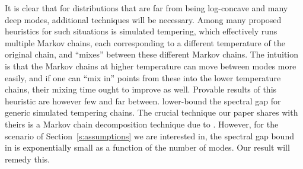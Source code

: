 
It is clear that for distributions that are far from being log-concave and many deep modes, additional techniques will be necessary. Among many proposed heuristics for such situations is simulated tempering, which effectively runs multiple Markov chains, each corresponding to a different temperature of the original chain, and ``mixes'' between these different Markov chains. The intuition is that the Markov chains at higher temperature can move between modes more easily, and if one can ``mix in'' points from these into the lower temperature chains, their mixing time ought to improve as well. Provable results of this heuristic are however few and far between.  
\cite{woodard2009conditions, zheng2003swapping} lower-bound the spectral gap for generic simulated tempering chains. The crucial technique our paper shares with theirs is a Markov chain decomposition technique due to \cite{madras2002markov}. However, for the scenario of Section~\ref{s:assumptions} we are interested in, the spectral gap bound in \cite{woodard2009conditions} is exponentially small as a function of the number of modes. Our result will remedy this. %


